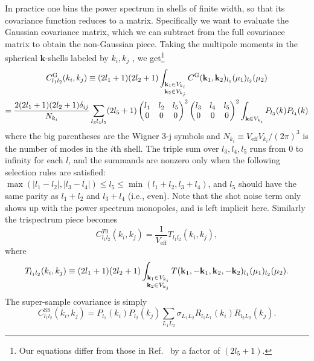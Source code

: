 \documentclass[a4paper,11pt]{article}
\let\L\relax
\DeclareMathOperator{\L}{\mathcal{L}}
\newcommand{\vk}{\mathbf{k}}
\renewcommand{\SS}{\mathrm{SS}}
\newcommand{\eff}{\mathrm{eff}}
\newcommand{\Gauss}{\mathrm{G}}
\begin{document}
In practice one bins the power spectrum in shells of finite width, so that its
covariance function reduces to a matrix.
Specifically we want to evaluate the Gaussian covariance matrix, which we can
subtract from the full covariance matrix to obtain the non-Gaussian piece.
Taking the multipole moments in the spherical $\vk$-shells labeled by $k_i,k_j$
\cite{GriebEtAl16}, we get\footnote{Our equations differ from those in
Ref.~\cite{GriebEtAl16} by a factor of $(2l_5+1)$.}
\begin{multline}
    \label{Cll_G}
    C^\Gauss_{l_1l_2}(k_i, k_j) \equiv (2l_1+1)(2l_2+1)
    \int_{\substack{\vspace{1ex}\\ \vk_1\in V_{k_i} \\ \vk_2\in V_{k_j}}}
    C^\Gauss(\vk_1, \vk_2) \L_{l_1}(\mu_1)\L_{l_2}(\mu_2) \\
    = \frac{2(2l_1+1)(2l_2+1)\delta_{ij}}{N_{k_i}}
    \sum_{l_3l_4l_5} (2l_5+1)
    \begin{pmatrix} l_1 & l_2 & l_5 \\ 0 & 0 & 0 \end{pmatrix}^2
    \begin{pmatrix} l_3 & l_4 & l_5 \\ 0 & 0 & 0 \end{pmatrix}^2
    \int_{\vk\in V_{k_i}} P_{l_3}(k)P_{l_4}(k)
\end{multline}
where the big parentheses are the Wigner 3-j symbols and $N_{k_i} \equiv V_\eff
V_{k_i}/(2\pi)^3$ is the number of modes in the $i$th shell.
The triple sum over $l_3,l_4,l_5$ runs from 0 to infinity for each $l$, and the
summands are nonzero only when the following selection rules are satisfied:
$\max(|l_1-l_2|,|l_3-l_4|)\leq l_5\leq\min(l_1+l_2,l_3+l_4)$, and $l_5$ should
have the same parity as $l_1+l_2$ and $l_3+l_4$ (i.e., even).
Note that the shot noise term only shows up with the power spectrum monopoles,
and is left implicit here.
Similarly the trispectrum piece becomes
\begin{equation}
    \label{Cll_T0}
    C_{l_1l_2}^{T0}(k_i, k_j) = \frac1{V_\eff} T_{l_1l_2}(k_i,k_j),
\end{equation}
where
\begin{equation}
    T_{l_1l_2}(k_i,k_j) \equiv (2l_1+1)(2l_2+1)
    \int_{\substack{\vspace{1ex}\\ \vk_1\in V_{k_i} \\ \vk_2\in V_{k_j}}}
    T(\vk_1,-\vk_1,\vk_2,-\vk_2) \L_{l_1}(\mu_1)\L_{l_2}(\mu_2).
\end{equation}
The super-sample covariance is simply
\begin{equation}
    \label{Cll_SS}
    C_{l_1l_2}^\SS(k_i, k_j) =
    P_{l_1}(k_i) P_{l_2}(k_j) \sum_{L_1L_2} \sigma_{L_1L_2}
    R_{l_1L_1}(k_i) R_{l_2L_2}(k_j).
\end{equation}
\end{document}
